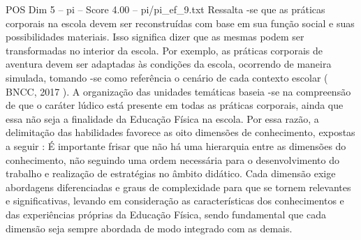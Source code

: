 \begin{textsample}{POS Dim 5 – pi – Score 4.00 – pi/pi\_ef\_9.txt}
Ressalta -se que as práticas corporais na escola devem ser reconstruídas com base em sua função social e suas possibilidades materiais.
Isso significa dizer que as mesmas podem ser transformadas no interior da escola.
Por exemplo, as práticas corporais de aventura devem ser adaptadas às condições da escola, ocorrendo de maneira simulada, tomando -se como referência o cenário de cada contexto escolar ( BNCC, 2017 ).
A organização das unidades temáticas baseia -se na compreensão de que o caráter lúdico está presente em todas as práticas corporais, ainda que essa não seja a finalidade da Educação Física na escola.
Por essa razão, a delimitação das habilidades favorece as oito dimensões de conhecimento, expostas a seguir : É importante frisar que não há uma hierarquia entre as dimensões do conhecimento, não seguindo uma ordem necessária para o desenvolvimento do trabalho e realização de estratégias no âmbito didático.
Cada dimensão exige abordagens diferenciadas e graus de complexidade para que se tornem relevantes e significativas, levando em consideração as características dos conhecimentos e das experiências próprias da Educação Física, sendo fundamental que cada dimensão seja sempre abordada de modo integrado com as demais.

\end{textsample}
